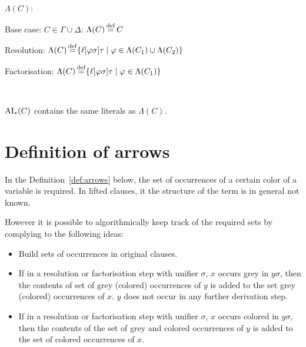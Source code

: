 \documentclass[,%
	draft=false,%
	numbers=noendperiod
	11pt,
	a4paper,
	oneside,%
	openany,
]{memoir}
\begin{document}
\begin{defi}
	$\Lambda(C)$:

	Base case: $C\in \Gamma\cup\Delta$: $\Lambda(C) \operatorname{\stackrel{\mathrm{def}}{=}} C$

	Resolution: $\Lambda(C) \operatorname{\stackrel{\mathrm{def}}{=}} \{ \ell[ \varphi \sigma] \tau \mid \varphi \in \Lambda(C_1) \cup \Lambda(C_2) \}$

	Factorisation: $\Lambda(C) \operatorname{\stackrel{\mathrm{def}}{=}} \{ \ell[ \varphi \sigma] \tau \mid \varphi \in \Lambda(C_1) \}$ 

	~

\end{defi}


\begin{lemma}
	\label{lemma:Lambda_vs_aiany}
	$\operatorname{AI}_\mathrm{*}(C)$ contains the same literals as $\Lambda(C)$.
\end{lemma}


\section{Definition of arrows}

\begin{remark}
	In the Definition~\ref{def:arrows} below, the set of occurrences of a certain color of a variable is required.
	In lifted clauses, it the structure of the term is in general not known. 

	However it is possible to algorithmically keep track of the required sets by complying to the following ideas: 

	\begin{itemize}
		\item Build sets of occurrences in original clauses.
		\item If in a resolution or factorisation step with unifier $\sigma$, $x$ occurs grey in $y\sigma$, then the contents of set of grey (colored) occurrences of $y$ is added to the set grey (colored) occurrences of $x$. $y$ does not occur in any further derivation step.
		\item If in a resolution or factorisation step with unifier $\sigma$, $x$ occurs colored in $y\sigma$, 
			then the contents of the set of grey and colored occurrences of $y$ is added to the set of colored occurrences of $x$.
			\qedhere
	\end{itemize}
\end{remark}
\end{document}
